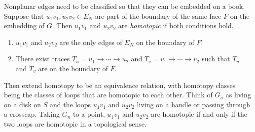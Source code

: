 Nonplanar edges need to be classified so that they can be embedded on a book. Suppose that \(u_1v_1, u_2v_2 \in E_N\) are part of the boundary of the same face \(F\) on the embedding of \(G\). Then \(u_1v_1\) and \(u_2v_2\) are \textit{homotopic} if both conditions hold.
\begin{enumerate}
	\item \(u_1v_1\) and \(u_2v_2\) are the only edges of \(E_N\) on the boundary of \(F\).
	\item There exist traces \(T_u = u_1 \rightarrow \cdots \rightarrow u_2\) and \(T_v = v_1 \rightarrow \cdots \rightarrow v_2\) such that \(T_u\) and \(T_v\) are on the boundary of \(F\).
\end{enumerate}
Then extend homotopy to be an equivalence relation, with homotopy classes being the classes of loops that are homotopic to each other. 
Think of \(G_n\) as living on a disk on \(S\) and the loops \(u_1v_1\) and \(u_2 v_2\) living on a handle or passing through a crosscap. Taking \(G_n\) to a point, \(u_1v_1\) and \(u_2v_2\) are homotopic if and only if the two loops are homotopic in a topological sense.

